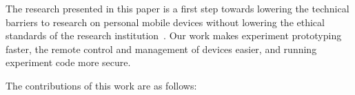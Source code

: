 The research presented in this paper is a first step towards lowering the technical
barriers to research on personal mobile devices without lowering the
ethical standards of the research institution~\cite{zevenbergen2013ethical}. 
%
%
Our work makes experiment
prototyping faster, the remote control and management of devices
easier, and running experiment code more secure. 

The contributions of this work are as follows:

